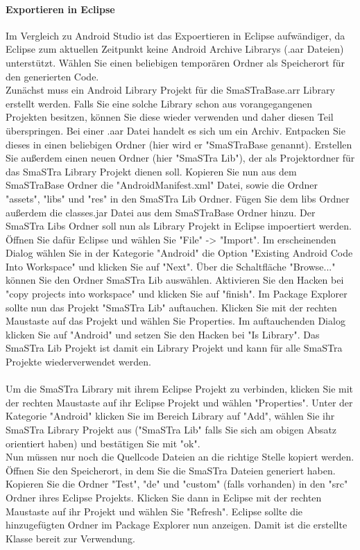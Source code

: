 \paragraph{Exportieren in Eclipse}
Im Vergleich zu Android Studio ist das Expoertieren in Eclipse aufw\"andiger, da Eclipse zum aktuellen Zeitpunkt keine Android Archive Librarys (.aar Dateien) unterst\"utzt.
W\"ahlen Sie einen beliebigen tempor\"aren Ordner als Speicherort f\"ur den generierten Code.
\\
Zun\"achst muss ein Android Library Projekt f\"ur die SmaSTraBase.arr Library erstellt werden. Falls Sie eine solche Library schon aus vorangegangenen Projekten besitzen, k\"onnen Sie diese wieder verwenden und daher diesen Teil \"uberspringen. Bei einer .aar Datei handelt es sich um ein Archiv. Entpacken Sie dieses in einen beliebigen Ordner (hier wird er "SmaSTraBase genannt). Erstellen Sie au{\ss}erdem einen neuen Ordner (hier "SmaSTra Lib"), der als Projektordner f\"ur das SmaSTra Library Projekt dienen soll. Kopieren Sie nun aus dem SmaSTraBase Ordner die "AndroidManifest.xml" Datei, sowie die Ordner "assets", "libs" und "res" in den SmaSTra Lib Ordner. F\"ugen Sie dem libs Ordner au{\ss}erdem die classes.jar Datei aus dem SmaSTraBase Ordner hinzu. Der SmaSTra Libs Ordner soll nun als Library Projekt in Eclipse impoertiert werden. \"Offnen Sie daf\"ur Eclipse und w\"ahlen Sie "File" -> "Import". Im erscheinenden Dialog w\"ahlen Sie in der Kategorie "Android" die Option "Existing Android Code Into Workspace" und klicken Sie auf "Next". \"Uber die Schaltfl\"ache "Browse..." k\"onnen Sie den Ordner SmaSTra Lib ausw\"ahlen. Aktivieren Sie den Hacken bei "copy projects into workspace" und klicken Sie auf "finish". Im Package Explorer sollte nun das Projekt "SmaSTra Lib" auftauchen. Klicken Sie mit der rechten Maustaste auf das Projekt und w\"ahlen Sie Properties. Im auftauchenden Dialog klicken Sie auf "Android" und setzen Sie den Hacken bei "Is Library". Das SmaSTra Lib Projekt ist damit ein Library Projekt und kann f\"ur alle SmaSTra Projekte wiederverwendet werden.
\\
\\
Um die SmaSTra Library mit ihrem Eclipse Projekt zu verbinden, klicken Sie mit der rechten Maustaste auf ihr Eclipse Projekt und w\"ahlen "Properties". Unter der Kategorie "Android" klicken Sie im Bereich Library auf "Add", w\"ahlen Sie ihr SmaSTra Library Projekt aus ("SmaSTra Lib" falls Sie sich am obigen Absatz orientiert haben) und best\"atigen Sie mit "ok". 
\\
Nun m\"ussen nur noch die Quellcode Dateien an die richtige Stelle kopiert werden. \"Offnen Sie den Speicherort, in dem Sie die SmaSTra Dateien generiert haben. Kopieren Sie die Ordner "Test", "de" und "custom" (falls vorhanden) in den "src" Ordner ihres Eclipse Projekts. Klicken Sie dann in Eclipse mit der rechten Maustaste auf ihr Projekt und w\"ahlen Sie "Refresh". Eclipse sollte die hinzugef\"ugten Ordner im Package Explorer nun anzeigen. Damit ist die erstellte Klasse bereit zur Verwendung.

